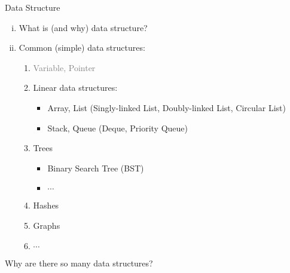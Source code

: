 \begin{frame}{}
  \begin{center}
    {\LARGE Data Structure} \\[0.60cm]
  \end{center}

  \begin{enumerate}[(i)]
    \setlength{\itemsep}{8pt}
    \item {\large What is (and why) data structure?}
      \pause
    \item {\large Common (simple) data structures:}
      \begin{enumerate}[(1)]
	\setlength{\itemsep}{4pt}
	\item \textcolor{gray}{Variable, Pointer}
	\item Linear data structures:
	  \begin{itemize}
	    \item Array, List (Singly-linked List, Doubly-linked List, Circular List)
	    \item Stack, Queue (Deque, Priority Queue)
	  \end{itemize}
	\item Trees
	  \begin{itemize}
	    \item Binary Search Tree (BST)
	    \item $\cdots$
	  \end{itemize}
	\item Hashes
	\item Graphs
	\item $\cdots$
      \end{enumerate}
  \end{enumerate}
\end{frame}

\begin{frame}{}
  \centerline{\large Why are there so many data structures?}

\end{frame}

